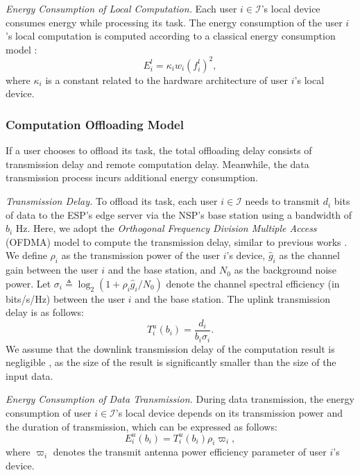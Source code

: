 \documentclass[lettersize,journal]{IEEEtran}
\begin{document}
\emph{Energy Consumption of Local Computation.}
Each user $i\in\mathcal{I}$'s local device consumes energy while processing its task. The energy consumption of the user $i$'s local computation is computed according to a classical energy consumption model \cite{mao2017survey,mao2016dynamic}:
\begin{equation}
    E^l_i=\kappa_iw_i(f_i^l)^2,
\end{equation}
where $\kappa_i$ is a constant related to the hardware architecture of user $i$'s local device.

\subsubsection{Computation Offloading Model}
If a user chooses to offload its task, the total offloading delay consists of transmission delay and remote computation delay. Meanwhile, the data transmission process incurs additional energy consumption.

\emph{Transmission Delay.} To offload its task, each user $i\in\mathcal{I}$ needs to transmit $d_i$ bits of data to the ESP's edge server via the NSP's base station using a bandwidth of $b_i$ Hz. Here, we adopt the \textit{Orthogonal Frequency Division Multiple Access} (OFDMA) model to compute the transmission delay, similar to previous works \cite{tutuncuoglu2024joint,tong2024stackelberg,zaw2023radio}. We define $\rho_i$ as the transmission power of the user $i$'s device, $\hat{g}_i$ as the channel gain between the user $i$ and the base station, and $N_0$ as the background noise power. Let $\sigma_i\triangleq\log_2\left(1+\rho_i \hat{g}_i/N_0\right)$ denote the channel spectral efficiency (in bits/s/Hz) between the user \( i \) and the base station.
The uplink transmission delay is as follows:
\begin{equation}\label{eq:T^u_i}
    T^u_i(b_i)=\frac{d_i}{b_i\sigma_i}.
\end{equation}
We assume that the downlink transmission delay of the computation result is negligible \cite{chen2015efficient,tutuncuoglu2024joint}, as the size of the result is significantly smaller than the size of the input data.

\emph{Energy Consumption of Data Transmission.}
During data transmission, the energy consumption of user $i\in\mathcal{I}$'s local device depends on its transmission power and the duration of transmission, which can be expressed as follows:
\begin{equation}\label{eq:E^u_i}
    E^u_i(b_i)=T^u_i(b_i)\rho_i\varpi_i,
\end{equation}
where $\varpi_i$ denotes the transmit antenna power efficiency parameter of user $i$'s device.
\end{document}
